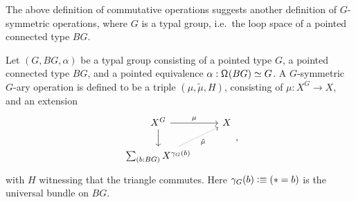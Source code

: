 \documentclass[reqno]{amsart}
\begin{document}
The above definition of commutative operations suggests another definition of
$G$-symmetric operations, where $G$ is a typal group, i.e.~the loop space of
a pointed connected type $BG$. 

\begin{defn}
Let $(G,BG,\alpha)$ be a typal group consisting of a pointed type $G$, a pointed
connected type $BG$, and a pointed equivalence $\alpha:\eqv{\loopspace{BG}}{G}$.
A $G$-symmetric $G$-ary operation is defined to be a triple $(\mu,\tilde{\mu},H)$,
consisting of $\mu:X^G\to X$, and an extension
\begin{equation*}
\begin{tikzcd}
X^G \arrow[r,"\mu"] \arrow[d] & X \\
\sm{b:BG} X^{\gamma_G(b)} \arrow[ur,densely dotted,swap,"\tilde{\mu}"]
\end{tikzcd},
\end{equation*}
with $H$ witnessing that the triangle commutes. Here $\gamma_G(b)\vcentcolon\equiv (\ast=b)$
is the universal bundle on $BG$.
\end{defn}
\end{document}
